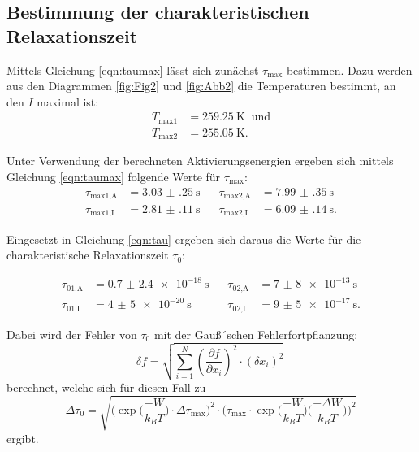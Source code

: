 \subsection{Bestimmung der charakteristischen Relaxationszeit}
Mittels Gleichung \ref{eqn:taumax} lässt sich zunächst $\tau_\text{max}$ bestimmen. Dazu
werden aus den Diagrammen \ref{fig:Fig2} und \ref{fig:Abb2} die Temperaturen bestimmt, an den $I$ maximal ist:
\begin{align*}
  T_\text{max1}&=\SI{259,25}{\K}\;\;\text{und}\\
  T_\text{max2}&=\SI{255,05}{\K}.
\end{align*}

Unter Verwendung der berechneten Aktivierungsenergien ergeben sich mittels Gleichung \ref{eqn:taumax}
folgende Werte für $\tau_\text{max}$:
\begin{align*}
\tau_\text{max1,A}&=\SI{3.03(25)}{\s}\;\;\;&\tau_\text{max2,A}&=\SI{7.99(35)}{\s}\\
\tau_\text{max1,I}&=\SI{2.81(11)}{\s}\;\;\;&\tau_\text{max2,I}&=\SI{6.09(14)}{\s}.
\end{align*}

Eingesetzt in Gleichung \ref{eqn:tau} ergeben sich daraus die Werte für
die charakteristische Relaxationszeit $\tau_0$:

\begin{align*}
\tau_\text{01,A}&=\SI{0.7(24)e-18}{\s}\;\;\;&\tau_\text{02,A}&=\SI{7(8)e-13}{\s}\\
\tau_\text{01,I}&=\SI{4(5)e-20}{\s}\;\;\;&\tau_\text{02,I}&=\SI{9(5)e-17}{\s}.
\end{align*}

Dabei wird der Fehler von $\tau_0$ mit der Gauß´schen Fehlerfortpflanzung:
\begin{equation}
  \delta f = \sqrt{ \sum_{i=1}^N \left( \frac{\partial f}{\partial x_i}\right)^2
  \cdot (\delta x_i)^2  } \:
  \label{eqn:gaus}
\end{equation}
berechnet, welche sich für diesen Fall zu
\begin{equation}
  \Delta \tau_0= \sqrt{\Bigg(\exp\Big(\frac{-W}{k_B T}\Big)\cdot\Delta\tau_\text{max}\Bigg)^2\cdot\Bigg(\tau_\text{max}\cdot\exp\Big(\frac{-W}{k_B T}\Big)\Big(\frac{-\Delta W}{k_B T}\Big)  \Bigg)^2}
\end{equation}
ergibt.
